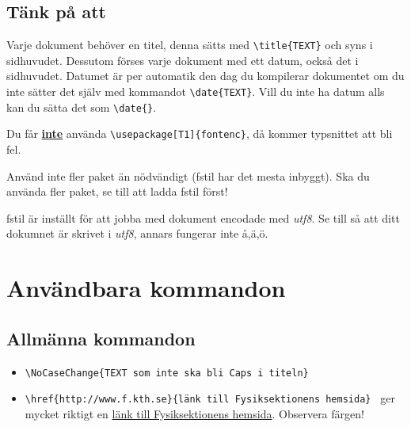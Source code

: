 \documentclass[a4paper]{article}
\newcommand{\bs}{\textbackslash}
\begin{document}
\subsection{Tänk på att}
Varje dokument behöver en titel, denna sätts med \texttt{\bs title\{TEXT\}} och syns i sidhuvudet. Dessutom förses varje dokument med ett datum, också det i sidhuvudet. Datumet är per automatik den dag du kompilerar dokumentet om du inte sätter det själv med kommandot \texttt{\bs date\{TEXT\}}. Vill du inte ha datum alls kan du sätta det som \texttt{\bs date\{\}}.

Du får \textbf{\underline{inte}} använda \texttt{\bs usepackage[T1]\{fontenc\}}, då kommer typsnittet att bli fel.

Använd inte fler paket än nödvändigt (fstil har det mesta inbyggt). Ska du använda fler paket, se till att ladda fstil först!

fstil är inställt för att jobba med dokument encodade med \textit{utf8}. Se till så att ditt dokumnet är skrivet i \textit{utf8}, annars fungerar inte å,ä,ö.

\section{Användbara kommandon}

\subsection{Allmänna kommandon}
\begin{itemize}
\item \texttt{\bs NoCaseChange\{TEXT som inte ska bli Caps i titeln\} }
\item \texttt{\bs href\{http://www.f.kth.se\}\{länk till Fysiksektionens hemsida\} } ger mycket riktigt en  \href{http://www.f.kth.se}{länk till Fysiksektionens hemsida}. Observera färgen!
\end{itemize}
\end{document}
